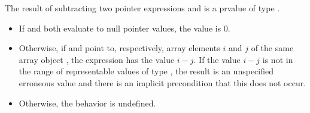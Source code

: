 \pnum
{}%
%
The result of subtracting two pointer expressions  and 
is a prvalue of type .
\begin{itemize}
\item If  and  both evaluate to null pointer values,
the value is 0.
\item Otherwise, if  and  point to, respectively,
array elements $i$ and $j$
of the same array object ,
the expression  has the value $i - j$.
If the value $i - j$
is not in the range of representable values
of type ,
the result is an unspecified erroneous value
and there is an implicit precondition
that this does not occur.
%
%
%
%
%
\item Otherwise, the behavior is undefined.
%
%
%
%
%
\end{itemize}

